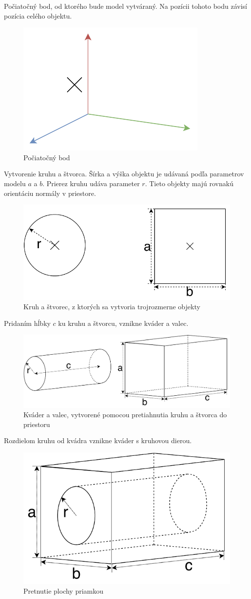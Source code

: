Počiatočný bod, od ktorého bude model vytváraný. Na pozícii tohoto bodu závisí pozícia celého objektu.\nopagebreak
\begin{figure}[H]
	\centering
	\includegraphics[height=0.3\textwidth]{obrazky-figures/Examples/A1.pdf}
	\caption{Počiatočný bod}
	\label{fig:A1}
\end{figure}
Vytvorenie kruhu a štvorca. Šírka a výška objektu je udávaná podľa parametrov modelu $a$ a $b$. Prierez kruhu udáva parameter $r$. Tieto objekty majú rovnakú orientáciu normály v priestore.
\nopagebreak
\begin{figure}[H]
	\centering
	\includegraphics[height=0.3\textwidth]{obrazky-figures/Examples/A2.pdf}
	\caption{Kruh a štvorec,  z ktorých sa vytvoria trojrozmerne objekty}
	\label{fig:A2}
\end{figure}
Pridaním hĺbky $c$ ku kruhu a štvorcu, vznikne kváder a valec.
\nopagebreak
\begin{figure}[H]
	\centering
	\includegraphics[height=0.3\textwidth]{obrazky-figures/Examples/A3.pdf}
	\caption{Kváder a valec, vytvorené pomocou pretiahnutia kruhu a štvorca do priestoru}
	\label{fig:A3}
\end{figure}
Rozdielom kruhu od kvádra vznikne kváder s kruhovou dierou.
\nopagebreak
\begin{figure}[H]
	\centering
	\includegraphics[height=0.3\textwidth]{obrazky-figures/Examples/A4.pdf}
	\caption{Pretnutie plochy priamkou}
	\label{fig:A4}
\end{figure}

